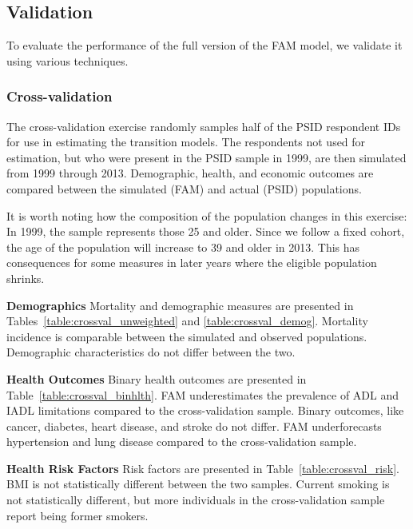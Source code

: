 \subsection{Validation}
\label{appendix:health-validation}
\noindent To evaluate the performance of the full version of the FAM model, we validate it using various techniques. 

\subsubsection{Cross-validation}
\noindent The cross-validation exercise randomly samples half of the PSID respondent IDs for use in estimating the transition models. The respondents not used for estimation, but who were present in the PSID sample in 1999, are then simulated from 1999 through 2013. Demographic, health, and economic outcomes are compared between the simulated (FAM) and actual (PSID) populations. 

\noindent It is worth noting how the composition of the population changes in this exercise: In 1999, the sample represents those 25 and older. Since we follow a fixed cohort, the age of the population will increase to 39 and older in 2013. This has consequences for some measures in later years where the eligible population shrinks.

\noindent\textbf{Demographics}
Mortality and demographic measures are presented in Tables~\ref{table:crossval_unweighted} and \ref{table:crossval_demog}. Mortality incidence is comparable between the simulated and observed populations. Demographic characteristics do not differ between the two.

\noindent\textbf{Health Outcomes}
Binary health outcomes are presented in Table~\ref{table:crossval_binhlth}. FAM underestimates the prevalence of ADL and IADL limitations compared to the cross-validation sample. Binary outcomes, like cancer, diabetes, heart disease, and stroke do not differ. FAM underforecasts hypertension and lung disease compared to the cross-validation sample.

\noindent\textbf{Health Risk Factors}
Risk factors are presented in Table~\ref{table:crossval_risk}. BMI is not statistically different between the two samples. Current smoking is not statistically different, but more individuals in the cross-validation sample report being former smokers.

